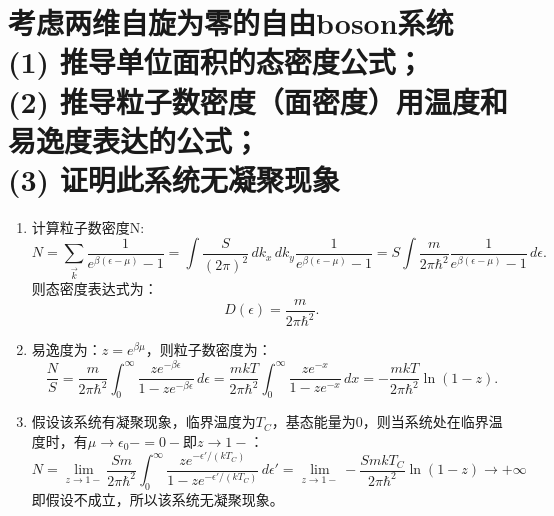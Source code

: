 \documentclass[reqno,a4paper,12pt]{amsart}
\begin{document}
\section{考虑两维自旋为零的自由boson系统 \\
(1) 推导单位面积的态密度公式； \\
(2) 推导粒子数密度（面密度）用温度和易逸度表达的公式；\\
(3) 证明此系统无凝聚现象}
\begin{tcolorbox}[breakable, colback = black!5!white, colframe = black]
\begin{enumerate}[(1)]
\item 计算粒子数密度N:
\[
	N = \sum_{\vec{k}} \frac{1}{e^{\beta(\epsilon-\mu)}-1} = \int \frac{S}{(2\pi)^2} \,dk_x\,dk_y \frac{1}{e^{\beta(\epsilon-\mu)}-1} = S \int \frac{m}{2\pi\hbar^2} \frac{1}{e^{\beta(\epsilon-\mu)}-1} \,d\epsilon.
\]
则态密度表达式为：
\[
	D(\epsilon) = \frac{m}{2\pi\hbar^2}.
\]

\item 易逸度为：$z = e^{\beta\mu}$，则粒子数密度为：
\[
	\frac{N}{S} = \frac{m}{2\pi\hbar^2} \int_0^{\infty} \frac{ze^{-\beta\epsilon}}{1-ze^{-\beta\epsilon}}\,d\epsilon = \frac{mkT}{2\pi\hbar^2}\int_0^{\infty} \frac{ze^{-x}}{1-ze^{-x}}\,dx = -\frac{mkT}{2\pi\hbar^2} \ln(1-z).
\]

\item 假设该系统有凝聚现象，临界温度为$T_C$，基态能量为$0$，则当系统处在临界温度时，有$\mu \to \epsilon_0- = 0-$即$z \to 1-$：
\[
	N = \lim_{z\to 1-} \frac{Sm}{2\pi\hbar^2}\int_0^{\infty} \frac{ze^{-\epsilon'/(kT_C)}}{1-ze^{-\epsilon'/(kT_C)}}\,d\epsilon' = \lim_{z\to 1-} -\frac{SmkT_C}{2\pi\hbar^2} \ln(1-z) \to +\infty
\]
即假设不成立，所以该系统无凝聚现象。
\end{enumerate}
\end{tcolorbox}
\end{document}
